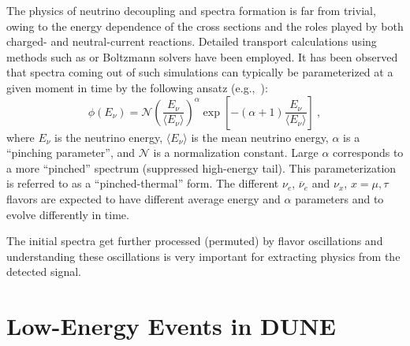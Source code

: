 
The physics of neutrino decoupling and spectra formation is far from trivial, owing to the energy dependence of the cross sections and the roles played by both charged- and neutral-current reactions.
Detailed transport calculations using methods such as  or Boltzmann solvers have been employed. It has been observed that spectra coming out of such simulations can typically be parameterized at a given moment in time by the following ansatz (e.g.,~\cite{Minakata:2008nc,Tamborra:2012ac}):
\begin{equation}
        \label{eq:pinched}
        \phi(E_{\nu}) = \mathcal{N} 
        \left(\frac{E_{\nu}}{\langle E_{\nu} \rangle}\right)^{\alpha} \exp\left[-\left(\alpha + 1\right)\frac{E_{\nu}}{\langle E_{\nu} \rangle}\right] \ ,
\end{equation}
where $E_{\nu}$ is the neutrino energy, $\langle E_\nu \rangle$ is the
mean neutrino energy, $\alpha$ is a ``pinching parameter'', and
$\mathcal{N}$ is a normalization constant.
%
Large $\alpha$ corresponds to a more ``pinched'' spectrum (suppressed
high-energy tail). This parameterization is referred to as a
``pinched-thermal'' form. The different $\nu_e$, $\overline{\nu}_e$ and
$\nu_x, \, x = \mu, \tau$ flavors are expected to have different
average energy and $\alpha$ parameters and to evolve differently in
time. 

The initial spectra get further processed (permuted) by flavor oscillations and understanding these oscillations is very important for extracting physics from the detected signal.


\section{Low-Energy Events in DUNE}\label{sec:lowe-events}

